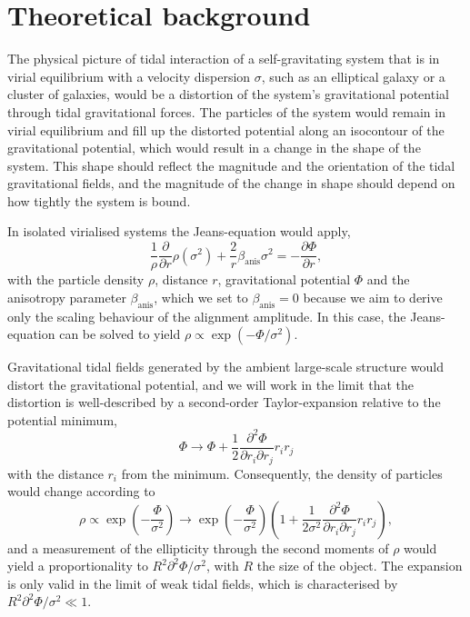 \documentclass[a4paper,fleqn,usenatbib]{mnras}
\begin{document}
\section{Theoretical background}
\label{sec:theory}
The physical picture of tidal interaction of a self-gravitating system that is in virial equilibrium with a velocity dispersion $\sigma$, such as an elliptical galaxy or a cluster of galaxies, would be a distortion of the system's gravitational potential through tidal gravitational forces. The particles of the system would remain in virial equilibrium and fill up the distorted potential along an isocontour of the gravitational potential, which would result in a change in the shape of the system. This shape should reflect the magnitude and the orientation of the tidal gravitational fields, and the magnitude of the change in shape should depend on how tightly the system is bound.

In isolated virialised systems the Jeans-equation would apply,
\begin{equation}
\frac{1}{\rho}\frac{\partial}{\partial r}\rho(\sigma^2) + \frac{2}{r}\beta_{\mathrm{anis}}\sigma^2 = 
-\frac{\partial\Phi}{\partial r},
\end{equation}
with the particle density $\rho$, distance $r$, gravitational potential $\Phi$ and the anisotropy parameter $\beta_{\mathrm{anis}}$, which we set to $\beta_{\mathrm{anis}}=0$ because we aim to derive only the scaling behaviour of the alignment amplitude. In this case, the Jeans-equation can be solved to yield $\rho\propto\exp(-\Phi/\sigma^2)$.

Gravitational tidal fields generated by the ambient large-scale structure would distort the gravitational potential, and we will work in the limit that the distortion is well-described by a second-order Taylor-expansion relative to the potential minimum,
\begin{equation}
\Phi\rightarrow\Phi+\frac{1}{2}\frac{\partial^2\Phi}{\partial r_i\partial r_j}r_ir_j
\end{equation}
with the distance $r_i$ from the minimum. Consequently, the density of particles would change according to
\begin{equation}
\rho\propto\exp\left(-\frac{\Phi}{\sigma^2}\right) \rightarrow 
\exp\left(-\frac{\Phi}{\sigma^2}\right)\left(1+\frac{1}{2\sigma^2}\frac{\partial^2\Phi}{\partial r_i\partial r_j}r_ir_j\right),
\end{equation}
and a measurement of the ellipticity through the second moments of $\rho$ would yield a proportionality to $R^2\partial^2\Phi/\sigma^2$, with $R$ the size of the object. The expansion is only valid in the limit of weak tidal fields, which is characterised by $R^2\partial^2\Phi/\sigma^2\ll 1$.
\end{document}
